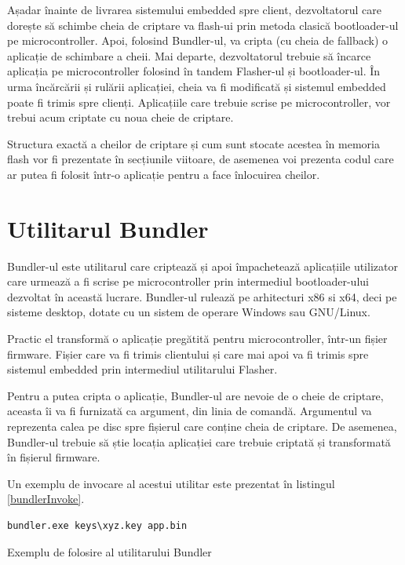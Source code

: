 \documentclass[12pt,a4paper,titlepage]{report}
\begin{document}
Așadar înainte de livrarea sistemului embedded spre client, dezvoltatorul care dorește să schimbe cheia de criptare va flash-ui prin metoda clasică bootloader-ul pe microcontroller. Apoi, folosind Bundler-ul, va cripta (cu cheia de fallback) o aplicație de schimbare a cheii. Mai departe, dezvoltatorul trebuie să încarce aplicația pe microcontroller folosind în tandem Flasher-ul și bootloader-ul. În urma încărcării și rulării aplicației, cheia va fi modificată și sistemul embedded poate fi trimis spre clienți. Aplicațiile care trebuie scrise pe microcontroller, vor trebui acum criptate cu noua cheie de criptare.

Structura exactă a cheilor de criptare și cum sunt stocate acestea în memoria flash vor fi prezentate în secțiunile viitoare, de asemenea voi prezenta codul care ar putea fi folosit într-o aplicație pentru a face înlocuirea cheilor.

\section{Utilitarul Bundler}

Bundler-ul este utilitarul care criptează și apoi împachetează aplicațiile utilizator care urmează a fi scrise pe microcontroller prin intermediul bootloader-ului dezvoltat în această lucrare.
Bundler-ul rulează pe arhitecturi x86 si x64, deci pe sisteme desktop, dotate cu un sistem de operare Windows sau GNU/Linux.

Practic el transformă o aplicație pregătită pentru microcontroller, într-un fișier firmware. Fișier care va fi trimis clientului și care mai apoi va fi trimis spre sistemul embedded prin intermediul utilitarului Flasher.

Pentru a putea cripta o aplicație, Bundler-ul are nevoie de o cheie de criptare, aceasta îi va fi furnizată ca argument, din linia de comandă. Argumentul va reprezenta calea pe disc spre fișierul care conține cheia de criptare. De asemenea, Bundler-ul trebuie să știe locația aplicației care trebuie criptată și transformată în fișierul firmware.

Un exemplu de invocare al acestui utilitar este prezentat în listingul \ref{bundlerInvoke}.

\begin{listing}[h]
\begin{verbatim}
bundler.exe keys\xyz.key app.bin
\end{verbatim}

\caption{Exemplu de folosire al utilitarului Bundler}
\label{bundlerInvoke}
\end{listing}
\end{document}
